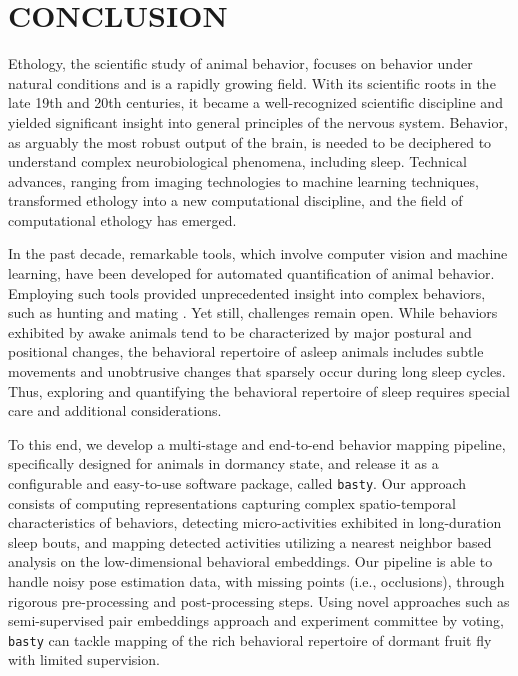 \setlength{\parindent}{0pt}
\chapter{\bf CONCLUSION}\label{chapter:conclusion}

Ethology, the scientific study of animal behavior, focuses on behavior under natural conditions and is a rapidly growing field.
With its scientific roots in the late 19th and 20th centuries, it became a well-recognized scientific discipline and yielded significant insight into general principles of the nervous system.
Behavior, as arguably the most robust output of the brain, is needed to be deciphered to understand complex neurobiological phenomena, including sleep.
Technical advances, ranging from imaging technologies to machine learning techniques, transformed ethology into a new computational discipline, and the field of computational ethology has emerged.

In the past decade, remarkable tools, which involve computer vision and machine learning, have been developed for automated quantification of animal behavior.
Employing such tools provided unprecedented insight into complex behaviors, such as hunting and mating \citep{mearns_deconstructing_2020, janisch_deciphering_2021}.
Yet still, challenges remain open.
While behaviors exhibited by awake animals tend to be characterized by major postural and positional changes, the behavioral repertoire of asleep animals includes subtle movements and unobtrusive changes that sparsely occur during long sleep cycles.
Thus, exploring and quantifying the behavioral repertoire of sleep requires special care and additional considerations.

To this end, we develop a multi-stage and end-to-end behavior mapping pipeline, specifically designed for animals in dormancy state, and release it as a configurable and easy-to-use software package, called \texttt{basty}.
Our approach consists of computing representations capturing complex spatio-temporal characteristics of behaviors, detecting micro-activities exhibited in long-duration sleep bouts, and mapping detected activities utilizing a nearest neighbor based analysis on the low-dimensional behavioral embeddings.
Our pipeline is able to handle noisy pose estimation data, with missing points (i.e., occlusions), through rigorous pre-processing and post-processing steps.
Using novel approaches such as semi-supervised pair embeddings approach and experiment committee by voting, \texttt{basty} can tackle mapping of the rich behavioral repertoire of dormant fruit fly with limited supervision.

